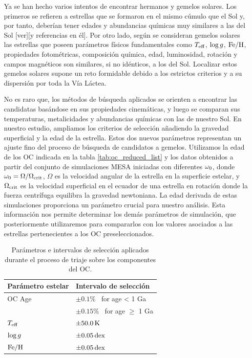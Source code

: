 Ya se han hecho varios intentos de encontrar hermanos y gemelos solares. Los primeros se refieren a estrellas que se formaron en el mismo cúmulo que el Sol y, por tanto, deberían tener edades y abundancias químicas muy similares a las del Sol \cite{Adibekyan2018}[ver][y referencias en él]. Por otro lado, según \cite{Strobel1996} se consideran gemelos solares las estrellas que poseen parámetros físicos fundamentales como $T_{\mathrm{eff}}$, $\mathrm{log} \, g$, $\mathrm{Fe}/\mathrm{H}$, propiedades fotométricas, composición química, edad, luminosidad, rotación y campos magnéticos son similares, si no idénticos, a los del Sol. Localizar estos gemelos solares supone un reto formidable debido a los estrictos criterios y a su dispersión por toda la Vía Láctea.\par 

No es raro que, los métodos de búsqueda aplicados se orienten a encontrar las candidatas basándose en sus propiedades cinemáticas, y luego se comparan sus temperaturas, metalicidades y abundancias químicas con las de nuestro Sol. En nuestro estudio, ampliamos los criterios de selección añadiendo la gravedad superficial y la edad de la estrella. Estos dos nuevos parámetros representan un ajuste fino del proceso de búsqueda de candidatos a gemelos. Utilizamos la edad de los OC indicada en la tabla \ref{tab:oc_reduced_list} y los datos obtenidos a partir del conjunto de simulaciones MESA iniciadas con diferentes $\omega_{\mathrm{0}}$, donde $\omega_{\mathrm{0}} = \Omega / \Omega_{\mathrm{crit}}$, $\Omega$ es la velocidad angular de la estrella en la superficie estelar, y $\Omega_{\mathrm{crit}}$ es la velocidad superficial en el ecuador de una estrella en rotación donde la fuerza centrífuga equilibra la gravedad newtoniana. La edad derivada de estas simulaciones proporciona un parámetro crucial para nuestro análisis. Esta información nos permite determinar los demás parámetros de simulación, que posteriormente utilizaremos para compararlos con los valores asociados a las estrellas pertenecientes a los OC preseleccionados.\par

\begin{table}
	\centering
	\begin{tabular}{ll} 
		\hline
		Parámetro estelar & Intervalo de selección\\
		\hline
		OC Age & $\pm0.1\%$ \, for age < 1 Ga \\
		& $\pm0.15\%$ \, for age $\geq$ 1 Ga \\
		$T_{\mathrm{eff}}$ & $\pm 50.0 \, \mathrm{K}$\\
		$\mathrm{log} \, g$ & $\pm 0.05 \, \mathrm{dex}$\\
		$\mathrm{Fe}/\mathrm{H}$ & $\pm 0.05 \, \mathrm{dex}$\\
		\hline
	\end{tabular}
	\caption{Parámetros e intervalos de selección aplicados durante el proceso de triaje sobre los componentes del OC.}
	\label{tab:sel_params}
\end{table}

